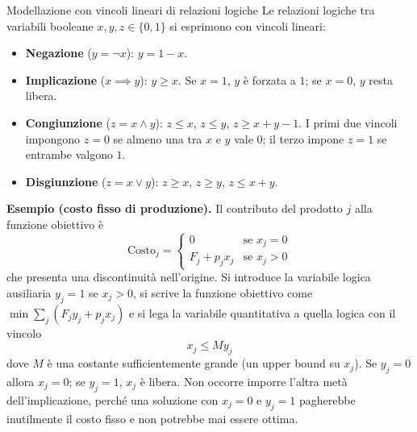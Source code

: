 \documentclass[12pt]{extarticle} %
\begin{document}
\begin{teoriabox}{Modellazione con vincoli lineari di relazioni logiche}
Le relazioni logiche tra variabili booleane $x,y,z \in \{0,1\}$ si esprimono con vincoli lineari:
\begin{itemize}
    \item \textbf{Negazione} ($y = \neg x$): $y = 1-x$.
    \item \textbf{Implicazione} ($x \implies y$): $y \ge x$. Se $x=1$, $y$ è forzata a $1$; se $x=0$, $y$ resta libera.
    \item \textbf{Congiunzione} ($z = x \wedge y$): $z \le x$, $z \le y$, $z \ge x+y-1$. I primi due vincoli impongono $z=0$ se almeno una tra $x$ e $y$ vale $0$; il terzo impone $z=1$ se entrambe valgono $1$.
    \item \textbf{Disgiunzione} ($z = x \vee y$): $z \ge x$, $z \ge y$, $z \le x+y$.
\end{itemize}

\noindent\textbf{Esempio (costo fisso di produzione).} Il contributo del prodotto $j$ alla funzione obiettivo è
\[
\text{Costo}_j = \begin{cases} 0 & \text{se } x_j = 0\\ F_j + p_j x_j & \text{se } x_j > 0\end{cases}
\]
che presenta una discontinuità nell'origine. Si introduce la variabile logica ausiliaria $y_j = 1$ se $x_j > 0$, si scrive la funzione obiettivo come $\min \sum_j (F_j y_j + p_j x_j)$ e si lega la variabile quantitativa a quella logica con il vincolo
\[
x_j \le M y_j
\]
dove $M$ è una costante sufficientemente grande (un upper bound su $x_j$). Se $y_j = 0$ allora $x_j = 0$; se $y_j = 1$, $x_j$ è libera. Non occorre imporre l'altra metà dell'implicazione, perché una soluzione con $x_j = 0$ e $y_j = 1$ pagherebbe inutilmente il costo fisso e non potrebbe mai essere ottima.
\end{teoriabox}
\end{document}
